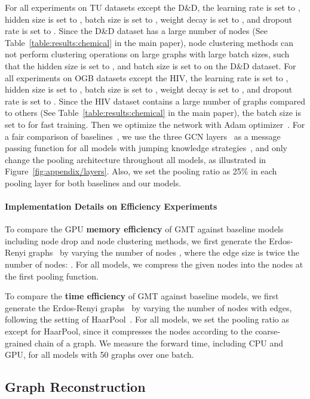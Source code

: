 For all experiments on TU datasets except the D\&D, the learning rate is set to , hidden size is set to , batch size is set to , weight decay is set to , and dropout rate is set to . Since the D\&D dataset has a large number of nodes (See Table~\ref{table:results:chemical} in the main paper), node clustering methods can not perform clustering operations on large graphs with large batch sizes, such that the hidden size is set to , and batch size is set to  on the D\&D dataset. For all experiments on OGB datasets except the HIV, the learning rate is set to , hidden size is set to , batch size is set to , weight decay is set to , and dropout rate is set to . Since the HIV dataset contains a large number of graphs compared to others (See Table~\ref{table:results:chemical} in the main paper), the batch size is set to  for fast training. Then we optimize the network with Adam optimizer~\citep{kingma2014adam}. For a fair comparison of baselines~\citep{SAGPool}, we use the three GCN layers~\citep{GCN} as a message passing function for all models with jumping knowledge strategies~\citep{JumpingKnowledge}, and only change the pooling architecture throughout all models, as illustrated in Figure~\ref{fig:appendix/layers}. Also, we set the pooling ratio as 25\% in each pooling layer for both baselines and our models.

\paragraph{Implementation Details on Efficiency Experiments \label{appendix/classification/efficiency}}
To compare the GPU \textbf{memory efficiency} of GMT against baseline models including node drop and node clustering methods, we first generate the Erdos-Renyi graphs~\citep{randomgraph} by varying the number of nodes , where the edge size  is twice the number of nodes: . For all models, we compress the given  nodes into the  nodes at the first pooling function.

To compare the \textbf{time efficiency} of GMT against baseline models, we first generate the Erdos-Renyi graphs~\citep{randomgraph} by varying the number of nodes  with  edges, following the setting of HaarPool~\citep{HaarPool}. For all models, we set the pooling ratio as  except for HaarPool, since it compresses the nodes according to the coarse-grained chain of a graph. We measure the forward time, including CPU and GPU, for all models with 50 graphs over one batch.

\subsection{Graph Reconstruction \label{appendix/reconstruction/experimentaldetail}}

